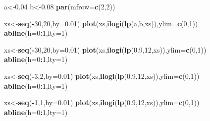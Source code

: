 \documentclass[
]{book}
\newenvironment{Shaded}{\begin{snugshade}}{\end{snugshade}}
\newcommand{\AttributeTok}[1]{\textcolor[rgb]{0.13,0.29,0.53}{#1}}
\newcommand{\DecValTok}[1]{\textcolor[rgb]{0.00,0.00,0.81}{#1}}
\newcommand{\FloatTok}[1]{\textcolor[rgb]{0.00,0.00,0.81}{#1}}
\newcommand{\FunctionTok}[1]{\textcolor[rgb]{0.13,0.29,0.53}{\textbf{#1}}}
\newcommand{\NormalTok}[1]{#1}
\newcommand{\OtherTok}[1]{\textcolor[rgb]{0.56,0.35,0.01}{#1}}
\newcommand{\SpecialCharTok}[1]{\textcolor[rgb]{0.81,0.36,0.00}{\textbf{#1}}}
\begin{document}
\begin{Shaded}
\begin{Highlighting}[]
\NormalTok{a}\OtherTok{\textless{}{-}}\FloatTok{0.04}
\NormalTok{b}\OtherTok{\textless{}{-}}\FloatTok{0.08}
\FunctionTok{par}\NormalTok{(}\AttributeTok{mfrow=}\FunctionTok{c}\NormalTok{(}\DecValTok{2}\NormalTok{,}\DecValTok{2}\NormalTok{))}

\NormalTok{xs}\OtherTok{\textless{}{-}}\FunctionTok{seq}\NormalTok{(}\SpecialCharTok{{-}}\DecValTok{30}\NormalTok{,}\DecValTok{20}\NormalTok{,}\AttributeTok{by=}\FloatTok{0.01}\NormalTok{)}
\FunctionTok{plot}\NormalTok{(xs,}\FunctionTok{ilogi}\NormalTok{(}\FunctionTok{lp}\NormalTok{(a,b,xs)),}\AttributeTok{ylim=}\FunctionTok{c}\NormalTok{(}\DecValTok{0}\NormalTok{,}\DecValTok{1}\NormalTok{))}
\FunctionTok{abline}\NormalTok{(}\AttributeTok{h=}\DecValTok{0}\SpecialCharTok{:}\DecValTok{1}\NormalTok{,}\AttributeTok{lty=}\DecValTok{1}\NormalTok{)}


\NormalTok{xs}\OtherTok{\textless{}{-}}\FunctionTok{seq}\NormalTok{(}\SpecialCharTok{{-}}\DecValTok{30}\NormalTok{,}\DecValTok{20}\NormalTok{,}\AttributeTok{by=}\FloatTok{0.01}\NormalTok{)}
\FunctionTok{plot}\NormalTok{(xs,}\FunctionTok{ilogi}\NormalTok{(}\FunctionTok{lp}\NormalTok{(}\FloatTok{0.9}\NormalTok{,}\DecValTok{12}\NormalTok{,xs)),}\AttributeTok{ylim=}\FunctionTok{c}\NormalTok{(}\DecValTok{0}\NormalTok{,}\DecValTok{1}\NormalTok{))}
\FunctionTok{abline}\NormalTok{(}\AttributeTok{h=}\DecValTok{0}\SpecialCharTok{:}\DecValTok{1}\NormalTok{,}\AttributeTok{lty=}\DecValTok{1}\NormalTok{)}


\NormalTok{xs}\OtherTok{\textless{}{-}}\FunctionTok{seq}\NormalTok{(}\SpecialCharTok{{-}}\DecValTok{3}\NormalTok{,}\DecValTok{2}\NormalTok{,}\AttributeTok{by=}\FloatTok{0.01}\NormalTok{)}
\FunctionTok{plot}\NormalTok{(xs,}\FunctionTok{ilogi}\NormalTok{(}\FunctionTok{lp}\NormalTok{(}\FloatTok{0.9}\NormalTok{,}\DecValTok{12}\NormalTok{,xs)),}\AttributeTok{ylim=}\FunctionTok{c}\NormalTok{(}\DecValTok{0}\NormalTok{,}\DecValTok{1}\NormalTok{))}
\FunctionTok{abline}\NormalTok{(}\AttributeTok{h=}\DecValTok{0}\SpecialCharTok{:}\DecValTok{1}\NormalTok{,}\AttributeTok{lty=}\DecValTok{1}\NormalTok{)}


\NormalTok{xs}\OtherTok{\textless{}{-}}\FunctionTok{seq}\NormalTok{(}\SpecialCharTok{{-}}\DecValTok{1}\NormalTok{,}\DecValTok{1}\NormalTok{,}\AttributeTok{by=}\FloatTok{0.01}\NormalTok{)}
\FunctionTok{plot}\NormalTok{(xs,}\FunctionTok{ilogi}\NormalTok{(}\FunctionTok{lp}\NormalTok{(}\FloatTok{0.9}\NormalTok{,}\DecValTok{12}\NormalTok{,xs)),}\AttributeTok{ylim=}\FunctionTok{c}\NormalTok{(}\DecValTok{0}\NormalTok{,}\DecValTok{1}\NormalTok{))}
\FunctionTok{abline}\NormalTok{(}\AttributeTok{h=}\DecValTok{0}\SpecialCharTok{:}\DecValTok{1}\NormalTok{,}\AttributeTok{lty=}\DecValTok{1}\NormalTok{)}
\end{Highlighting}
\end{Shaded}
\end{document}
